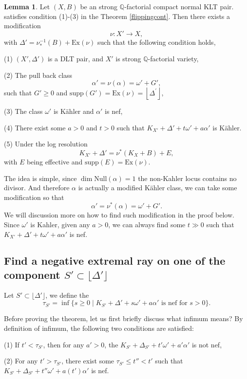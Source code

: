 \documentclass[11pt]{article}
\theoremstyle{definition}
\newtheorem{lemma}[theorem]{Lemma}
\begin{document}
	\begin{lemma}
		Let $(X,B)$ be an strong $\mathbb{Q}$-factorial compact normal KLT pair. satisfies condition (1)-(3) in the Theorem \ref{flippingcont}. Then there exists a modification $$\nu: X' \to X,$$ with $\Delta' = \nu^{-1}_* (B) + \text{Ex}(\nu)$ such that the following condition holds,
		
		(1) $(X',\Delta')$ is a DLT pair, and $X'$ is strong $\mathbb{Q}$-factorial variety,
		
		(2) The pull back class $$\alpha' = \nu (\alpha) = \omega' + G',$$such that $G' \ge 0$ and $\text{supp}(G') = \text{Ex}(\nu) = \left\lfloor\Delta^{\prime}\right\rfloor$, 
		
		(3) The class $\omega'$ is K\"ahler and $\alpha ' $ is nef,
		
		(4) There exist some $a>0$ and $t>0$ such that $K_{X'} + \Delta ' + t \omega' + a \alpha'$ is K\"ahler.
		
		(5) Under the log resolution $$K_{X'} + \Delta ' = \nu^* (K_X+B) + E,$$with $E$ being effective and $\text{supp}(E) = \text{Ex}(\nu)$. 
		
	\end{lemma}
	
	The idea is simple, since $\dim \text{Null}(\alpha) = 1$ the non-Kahler locus contains no divisor. And therefore $\alpha$ is actually a modified K\"ahler class, we can take some modification so that $$\alpha ' = \nu^* (\alpha) = \omega' + G'.$$
	We will discussion more on how to find such  modification in the proof below. Since $\omega'$ is Kahler, given any $a>0$, we can always find some $t \gg 0$ such that $K_{X'}+ \Delta' + t \omega' + a \alpha '$ is nef. 
	
	\subsection{Find a negative extremal ray on one of the component $S' \subset \lfloor{\Delta'}\rfloor$}
	Let $S' \subset \lfloor{\Delta'}\rfloor$, we define the $$\tau_{S'} = \inf\{s\ge 0 \mid  K_{S'}+ \Delta ' + s \omega' + a \alpha' \text{ is nef for }s>0\}.$$
	
	Before proving the theorem, let us first briefly discuss what infimum means? By definition of infimum, the following two conditions are satisfied: 
	
	(1) If $t' < \tau_{S'}$, then for any $a'>0$, the $K_{S'} + \Delta_{S'} + t'\omega' + a' \alpha'$ is not nef, 
	
	(2) For any $t' >\tau _{S'}$, there exist some $\tau_{S'}\le t''< t'$ such that $K_{S'}+ \Delta_{S'} + t''\omega' + a (t') \alpha'$ is nef. 
	
\end{document}
